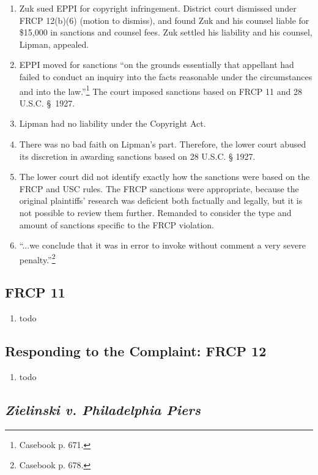 \begin{enumerate}
    \item Zuk sued EPPI for copyright infringement. District court dismissed under FRCP 12(b)(6) (motion to dismiss), and found Zuk and his counsel liable for \$15,000 in sanctions and counsel fees. Zuk settled his liability and his counsel, Lipman, appealed.
    \item EPPI moved for sanctions ``on the grounds essentially that appellant had failed to conduct an inquiry into the facts reasonable under the circumstances and into the law.''\footnote{Casebook p. 671.} The court imposed sanctions based on FRCP 11 and 28 U.S.C. § 1927.
    \item Lipman had no liability under the Copyright Act.
    \item There was no bad faith on Lipman's part. Therefore, the lower court abused its discretion in awarding sanctions based on 28 U.S.C. § 1927.
    \item The lower court did not identify exactly how the sanctions were based on the FRCP and USC rules. The FRCP sanctions were appropriate, because the original plaintiffs' research was deficient both factually and legally, but it is not possible to review them further. Remanded to consider the type and amount of sanctions specific to the FRCP violation.
    \item ``...we conclude that it was in error to invoke without comment a very severe penalty.''\footnote{Casebook p. 678.}
\end{enumerate}

\subsection{FRCP 11}

\begin{enumerate}
    \item todo
\end{enumerate}

\subsection{Responding to the Complaint: FRCP 12}

\begin{enumerate}
    \item todo
\end{enumerate}

\subsection{\emph{Zielinski v. Philadelphia Piers}}

